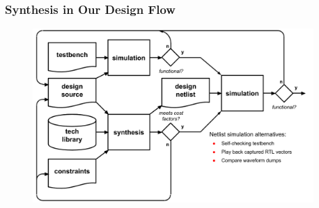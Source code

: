 \documentclass[t, notes, xcolor=table]{beamer}
\begin{document}
\begin{frame}
\frametitle{Synthesis in Our Design Flow}
\begin{figure}
    \includegraphics[width=0.95\textwidth]{img/12_flow_synth.png}
\end{figure}
\end{frame}
\end{document}
